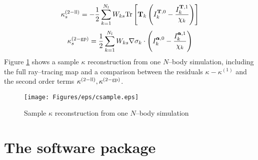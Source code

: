 \begin{equation}
\label{eq:3:kappa-ll-num-lin}
\kappa_s^{(2-{\rm ll})} = -\frac{1}{2}\sum_{k=1}^{N_l} W_{ks} {\rm Tr}\left[\mathbf{T}_k\left(I^{\mathbf{T},0}_k-\frac{I^{\mathbf{T},1}_k}{\chi_k}\right)\right]
\end{equation}
%
\begin{equation}
\label{eq:3:kappa-gp-num-lin}
\kappa_s^{(2-{\rm gp})} = \frac{1}{2}\sum_{k=1}^{N_l} W_{ks}\nabla\sigma_k\cdot\left(I^{\pmb{\alpha},0}_k - \frac{I^{\pmb{\alpha},1}_k}{\chi_k}\right)
\end{equation}
%
Figure \ref{fig:3:csample} shows a sample $\kappa$ reconstruction from one $N$--body simulation, including the full ray--tracing map and a comparison between the residuals $\kappa-\kappa^{(1)}$ and the second order terms $\kappa^{(2-{\rm ll})},\kappa^{(2-{\rm gp})}$.  

\begin{figure}
\begin{center}
\texttt{[image: Figures/eps/csample.eps]}
\end{center}
\caption{Sample $\kappa$ reconstruction from one $N$--body simulation}
\label{fig:3:csample}
\end{figure}


\section{The \LT software package}

